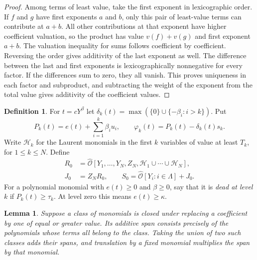 \documentclass[11pt, letterpaper]{article}
\newtheorem{lemma}[theorem]{Lemma}
\theoremstyle{definition}
\newtheorem{definition}[theorem]{Definition}
\theoremstyle{remark}
\begin{document}
\begin{proof}
    Among terms of least value, take the first exponent in lexicographic order.
    If $f$ and $g$ have first exponents $a$ and $b$, only this pair of least-value terms can contribute at $a + b$.
    All other contributions at that exponent have higher coefficient valuation, so the product has value $v(f) + v(g)$ and first exponent $a + b$.
    The valuation inequality for sums follows coefficient by coefficient.
    Reversing the order gives additivity of the last exponent as well.
    The difference between the last and first exponents is lexicographically nonnegative for every factor.
    If the differences sum to zero, they all vanish.
    This proves uniqueness in each factor and subproduct, and subtracting the weight of the exponent from the total value gives additivity of the coefficient values.
\end{proof}

\begin{definition}
    \label{def:GM}
    For $t = cY^{\beta}$ let $\delta_{k}(t) = \max(\{0\} \cup \{-\beta_{i} : i > k\})$.
    Put
    \[
        P_{k}(t) = e(t) + \sum_{i = 1}^{k} \beta_{i}u_{i},
        \qquad
        \varphi_{k}(t) = P_{k}(t) - \delta_{k}(t)s_{k}.
    \]
    Write $\mathcal{H}_{k}$ for the Laurent monomials in the first $k$ variables of value at least $T_{k}$, for $1 \le k \le N$.
    Define
    \[
        \begin{aligned}
            R_{0} &= \widehat{\mathcal{O}}[Y_{1}, \ldots, Y_{N}, Z_{N},
                        \mathcal{H}_{1} \cup \cdots \cup \mathcal{H}_{N}], \\
            J_{0} &= Z_{N}R_{0}, \qquad
            S_{0} = \widehat{\mathcal{O}}[Y_{i} : i \in \Lambda] + J_{0}.
        \end{aligned}
    \]
    For a polynomial monomial with $e(t) \ge 0$ and $\beta \ge 0$, say that it is \emph{dead at level $k$} if $P_{k}(t) \ge \tau_{k}$.
    At level zero this means $e(t) \ge \kappa$.
\end{definition}

\begin{lemma}
    \label{lem:MC}
    Suppose a class of monomials is closed under replacing a coefficient by one of equal or greater value.
    Its additive span consists precisely of the polynomials whose terms all belong to the class.
    Taking the union of two such classes adds their spans, and translation by a fixed monomial multiplies the span by that monomial.
\end{lemma}
\end{document}

